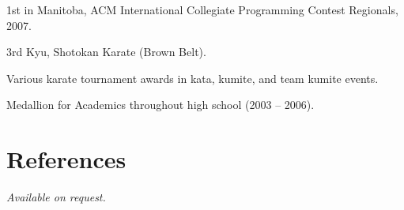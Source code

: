 \documentclass[margin,line,letterpaper]{resume}
\begin{document}
\begin{resume}
  \begin{list2}
    \item 1st in Manitoba, ACM International Collegiate Programming Contest Regionals, 2007.
    \item 3rd Kyu, Shotokan Karate (Brown Belt).
    \item Various karate tournament awards in kata, kumite, and team kumite events.
    \item Medallion for Academics throughout high school (2003 -- 2006).
  \end{list2}

  \section{\mysidestyle References}

  {\sl Available on request.}

\end{resume}
\end{document}
